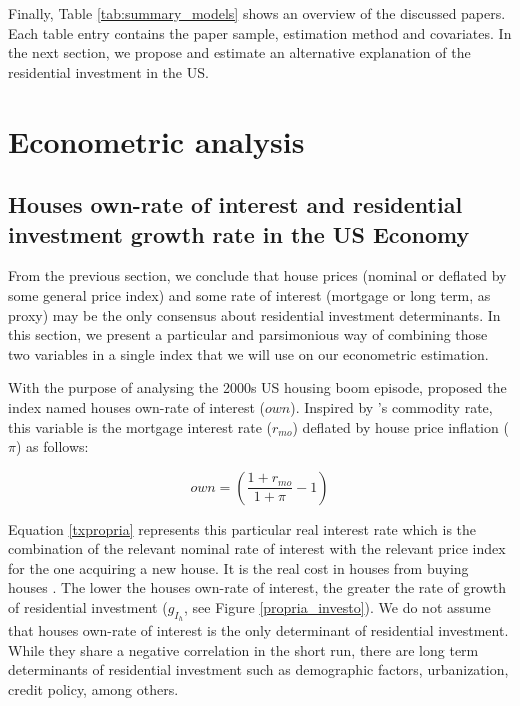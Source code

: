 \documentclass[12pt, a4paper]{article}
\begin{document}
Finally, Table \ref{tab:summary_models} shows an overview of the discussed papers.
Each table entry contains the paper sample, estimation method and covariates.
In the next section, we propose and estimate an alternative explanation of the residential investment in the US.




\section{Econometric analysis}
\label{sec:orgc625214}
\label{sec:VECM}
\subsection{Houses own-rate of interest and residential investment growth rate in the US Economy}
\label{sec:org7f32194}
\label{sec:own}

From the previous section, we conclude that house prices (nominal or deflated by some general price index) and some rate of interest (mortgage or long term, as proxy) may be the only consensus about residential investment determinants.
In this section, we present a particular and parsimonious way of combining those two variables  in a single index that we will use on our econometric estimation.


With the purpose of analysing the 2000s US housing boom episode, \textcite{teixeira_crescimento_2015}  proposed the index named houses own-rate of interest (\(own\)).
Inspired by \citeauthor*{sraffaDrHayekMoney1932}'s \citeyear{sraffaDrHayekMoney1932} commodity rate, this variable is the mortgage interest rate (\(r_{mo}\)) deflated by house price inflation (\(\pi\)) as follows:
\begin{latex}
\begin{equation}
\label{txpropria}
own =  \left(\frac{1+r_{mo}}{1+\pi} - 1\right)
\end{equation}
\end{latex}
Equation \ref{txpropria} represents this particular real interest rate which is the combination of the relevant nominal rate of interest with the relevant price index for the one acquiring a new house.
It is the real cost in houses from buying houses  \cite[p.~53]{teixeira_crescimento_2015}.
The lower the houses own-rate of interest, the greater the rate of growth of residential investment (\(g_{I_{h}}\), see Figure \ref{propria_investo}).
We do not assume that houses own-rate of interest is the only determinant of residential investment.
While they share a negative correlation in the short run, there are long term determinants of residential investment such as demographic factors, urbanization, credit policy, among others.
\end{document}
